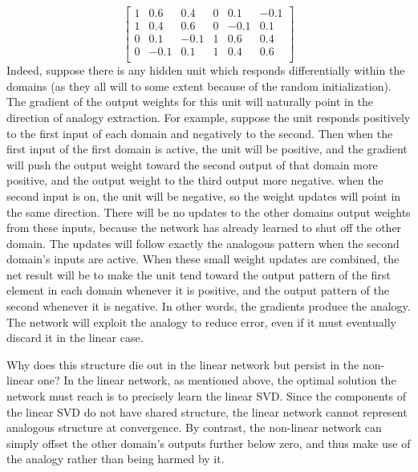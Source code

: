\documentclass[10pt,letterpaper]{article}
\begin{document}
{ 
\[
\left[ \begin{matrix} 
1 & 0.6 & 0.4 & 0 & 0.1 & -0.1 \\
1 & 0.4 & 0.6 & 0 & -0.1 & 0.1 \\
0 & 0.1 & -0.1 & 1 & 0.6 & 0.4  \\
0 & -0.1 & 0.1 & 1 & 0.4 & 0.6  \\
\end{matrix}  \right] 
\] 
}
Indeed, suppose there is any hidden unit which responds differentially within the domains (as they all will to some extent because of the random initialization). The gradient of the output weights for this unit will naturally point in the direction of analogy extraction. For example, suppose the unit responds positively to the first input of each domain and negatively to the second. Then when the first input of the first domain is active, the unit will be positive, and the gradient will push the output weight toward the second output of that domain more positive, and the output weight to the third output more negative. when the second input is on, the unit will be negative, so the weight updates will point in the same direction. There will be no updates to the other domains output weights from these inputs, because the network has already learned to shut off the other domain. The updates will follow exactly the analogous pattern when the second domain's inputs are active. When these small weight updates are combined, the net result will be to make the unit tend toward the output pattern of the first element in each domain whenever it is positive, and the output pattern of the second whenever it is negative. In other words, the gradients produce the analogy. The network will exploit the analogy to reduce error, even if it must eventually discard it in the linear case.  \par
Why does this structure die out in the linear network but persist in the non-linear one? In the linear network, as mentioned above, the optimal solution the network must reach is to precisely learn the linear SVD. Since the components of the linear SVD do not have shared structure, the linear network cannot represent analogous structure at convergence. By contrast, the non-linear network can simply offset the other domain's outputs further below zero, and thus make use of the analogy rather than being harmed by it. 
\end{document}
